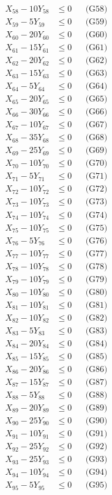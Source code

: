 \documentclass[a4paper,10pt]{article}
\begin{document}
{\begin{align}
X_{58} - 10Y_{58} &\leq 0 && \text{(G58)} \\
X_{59} - 5Y_{59} &\leq 0 && \text{(G59)} \\
X_{60} - 20Y_{60} &\leq 0 && \text{(G60)} \\
X_{61} - 15Y_{61} &\leq 0 && \text{(G61)} \\
X_{62} - 20Y_{62} &\leq 0 && \text{(G62)} \\
\allowbreak
X_{63} - 15Y_{63} &\leq 0 && \text{(G63)} \\
X_{64} - 5Y_{64} &\leq 0 && \text{(G64)} \\
X_{65} - 20Y_{65} &\leq 0 && \text{(G65)} \\
X_{66} - 30Y_{66} &\leq 0 && \text{(G66)} \\
X_{67} - 10Y_{67} &\leq 0 && \text{(G67)} \\
X_{68} - 35Y_{68} &\leq 0 && \text{(G68)} \\
X_{69} - 25Y_{69} &\leq 0 && \text{(G69)} \\
X_{70} - 10Y_{70} &\leq 0 && \text{(G70)} \\
X_{71} - 5Y_{71} &\leq 0 && \text{(G71)} \\
X_{72} - 10Y_{72} &\leq 0 && \text{(G72)} \\
\allowbreak
X_{73} - 10Y_{73} &\leq 0 && \text{(G73)} \\
X_{74} - 10Y_{74} &\leq 0 && \text{(G74)} \\
X_{75} - 10Y_{75} &\leq 0 && \text{(G75)} \\
X_{76} - 5Y_{76} &\leq 0 && \text{(G76)} \\
X_{77} - 10Y_{77} &\leq 0 && \text{(G77)} \\
X_{78} - 10Y_{78} &\leq 0 && \text{(G78)} \\
X_{79} - 10Y_{79} &\leq 0 && \text{(G79)} \\
X_{80} - 10Y_{80} &\leq 0 && \text{(G80)} \\
X_{81} - 10Y_{81} &\leq 0 && \text{(G81)} \\
X_{82} - 10Y_{82} &\leq 0 && \text{(G82)} \\
\allowbreak
X_{83} - 5Y_{83} &\leq 0 && \text{(G83)} \\
X_{84} - 20Y_{84} &\leq 0 && \text{(G84)} \\
X_{85} - 15Y_{85} &\leq 0 && \text{(G85)} \\
X_{86} - 20Y_{86} &\leq 0 && \text{(G86)} \\
X_{87} - 15Y_{87} &\leq 0 && \text{(G87)} \\
X_{88} - 5Y_{88} &\leq 0 && \text{(G88)} \\
X_{89} - 20Y_{89} &\leq 0 && \text{(G89)} \\
X_{90} - 25Y_{90} &\leq 0 && \text{(G90)} \\
X_{91} - 10Y_{91} &\leq 0 && \text{(G91)} \\
X_{92} - 25Y_{92} &\leq 0 && \text{(G92)} \\
\allowbreak
X_{93} - 25Y_{93} &\leq 0 && \text{(G93)} \\
X_{94} - 10Y_{94} &\leq 0 && \text{(G94)} \\
X_{95} - 5Y_{95} &\leq 0 && \text{(G95)} \\
\allowbreak
\end{align}
}
\end{document}
